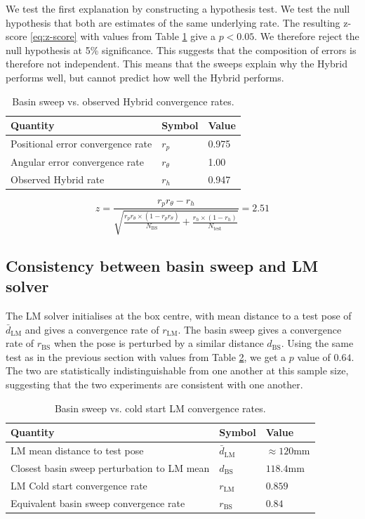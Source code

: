 We test the first explanation by constructing a hypothesis test. We test the null hypothesis that both are estimates of the same underlying rate. The resulting z-score \eqref{eq:z-score} with values from Table \ref{tab:z-scoring} give a $p < 0.05$. We therefore reject the null hypothesis at 5\% significance. This suggests that the composition of errors is therefore not independent. This means that the sweeps explain why the Hybrid performs well, but cannot predict how well the Hybrid performs. 

\begin{table}
  \centering 
  \begin{tabular}{lll}
    \toprule 
    Quantity & Symbol & Value \\
    \midrule 
    Positional error convergence rate & $r_p$ & 0.975 \\
    Angular error convergence rate & $r_\theta$ & 1.00 \\
    Observed Hybrid rate & $r_h$ & 0.947 \\
    \bottomrule 
  \end{tabular}
  \caption{Basin sweep vs. observed Hybrid convergence rates.}
  \label{tab:z-scoring}
\end{table}
\begin{equation}
  z = \frac{r_pr_\theta - r_h}{\sqrt{\frac{r_pr_\theta \times (1-r_pr_\theta)}{N_{\mathrm{BS}}}+\frac{r_h \times (1-r_h)}{N_\mathrm{test}}}} = 2.51 
  \label{eq:z-score}
\end{equation}


\subsection{Consistency between basin sweep and LM solver} The LM solver initialises at the box centre, with mean distance to a test pose of $\bar{d}_{\mathrm{LM}}$ and gives a convergence rate of $r_\mathrm{LM}$. The basin sweep gives a convergence rate of $r_{\mathrm{BS}}$ when the pose is perturbed by a similar distance $d_\mathrm{BS}$. Using the same test as in the previous section with values from Table \ref{tab:conv_rates_cold}, we get a $p$ value of $0.64$. The two are statistically indistinguishable from one another at this sample size, suggesting that the two experiments are consistent with one another.
\begin{table}
  \centering 
  \begin{tabular}{lll}
    \toprule 
    Quantity & Symbol & Value \\
    \midrule 
    LM mean distance to test pose & $\bar{d}_\mathrm{LM}$ & $\approx 120$mm \\
    Closest basin sweep perturbation to LM mean & $d_\mathrm{BS}$ & $118.4$mm \\
    LM Cold start convergence rate & $r_\mathrm{LM}$ & $0.859$ \\
    Equivalent basin sweep convergence rate & $r_\mathrm{BS}$ & $0.84$ \\
    \bottomrule 
  \end{tabular}
  \caption{Basin sweep vs. cold start LM convergence rates.}
  \label{tab:conv_rates_cold}
\end{table}



